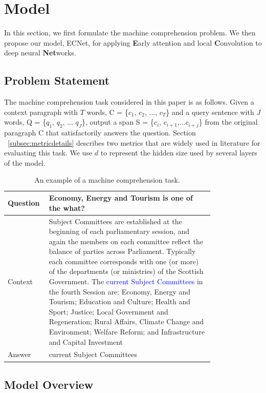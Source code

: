 \section{Model}
\label{sec:model}

In this section, we first formulate the machine comprehension problem. We then propose our model, ECNet, for applying \textbf{E}arly attention and local \textbf{C}onvolution to deep neural \textbf{Net}works.

\subsection{Problem Statement}
\label{subsec:problemstatement}

The machine comprehension task considered in this paper is as follows. Given a context paragraph with $T$ words, C = \{$c_1$, $c_2$, ..., $c_T$\} and a query sentence with $J$ words, Q = \{$q_1$, $q_2$, ... $q_J$\}, output a span S = \{$c_i$, $c_{i+1}$,...${c_{i+j}}$\} from the original paragraph C that satisfactorily answers the question. Section ~\ref{subsec:metricdetails} describes two metrics that are widely used in literature for evaluating this task. We use $d$ to represent the hidden size used by several layers of the model.

\begin{table}[htbp]
    \caption{An example of a machine comprehension task.}
    \label{table:economicSchools} 
    \centering
    \begin{tabular}{|l|p{0.8\linewidth}|}
    \hline
    Question   &  Economy, Energy and Tourism is one of the what? \tabularnewline \hline
    Context  & Subject Committees are established at the beginning of each parliamentary session, and again the members on each committee reflect the balance of parties across Parliament. Typically each committee corresponds with one (or more) of the departments (or ministries) of the Scottish Government. The \textcolor{blue}{current Subject Committees} in the fourth Session are: Economy, Energy and Tourism; Education and Culture; Health and Sport; Justice; Local Government and Regeneration; Rural Affairs, Climate Change and Environment; Welfare Reform; and Infrastructure and Capital Investment \tabularnewline \hline
    Answer   & current Subject Committees \tabularnewline \hline
    \end{tabular}
 
\end{table}

\subsection{Model Overview}
\label{subsec:models}

